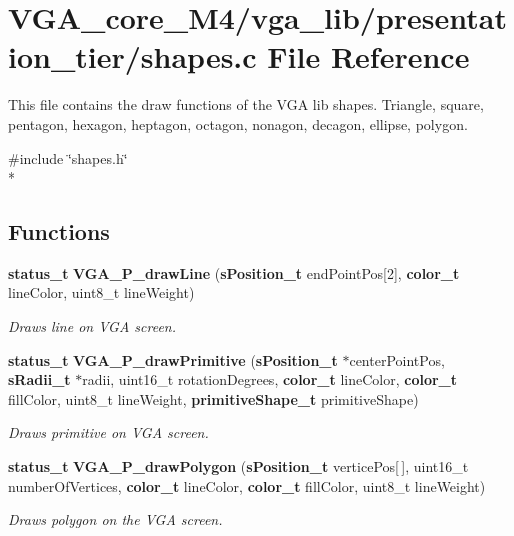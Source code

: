 \section{V\+G\+A\+\_\+core\+\_\+\+M4/vga\+\_\+lib/presentation\+\_\+tier/shapes.c File Reference}
\label{shapes_8c}


This file contains the draw functions of the V\+GA lib shapes. Triangle, square, pentagon, hexagon, heptagon, octagon, nonagon, decagon, ellipse, polygon.  


{\ttfamily \#include \char`\"{}shapes.\+h\char`\"{}}\\*
\subsection*{Functions}
\begin{DoxyCompactItemize}
\item 
{\bf status\+\_\+t} {\bf V\+G\+A\+\_\+\+P\+\_\+draw\+Line} ({\bf s\+Position\+\_\+t} end\+Point\+Pos[2], {\bf color\+\_\+t} line\+Color, uint8\+\_\+t line\+Weight)
\begin{DoxyCompactList}\small\item\em Draws line on V\+GA screen. \end{DoxyCompactList}\item 
{\bf status\+\_\+t} {\bf V\+G\+A\+\_\+\+P\+\_\+draw\+Primitive} ({\bf s\+Position\+\_\+t} $\ast$center\+Point\+Pos, {\bf s\+Radii\+\_\+t} $\ast$radii, uint16\+\_\+t rotation\+Degrees, {\bf color\+\_\+t} line\+Color, {\bf color\+\_\+t} fill\+Color, uint8\+\_\+t line\+Weight, {\bf primitive\+Shape\+\_\+t} primitive\+Shape)
\begin{DoxyCompactList}\small\item\em Draws primitive on V\+GA screen. \end{DoxyCompactList}\item 
{\bf status\+\_\+t} {\bf V\+G\+A\+\_\+\+P\+\_\+draw\+Polygon} ({\bf s\+Position\+\_\+t} vertice\+Pos[$\,$], uint16\+\_\+t number\+Of\+Vertices, {\bf color\+\_\+t} line\+Color, {\bf color\+\_\+t} fill\+Color, uint8\+\_\+t line\+Weight)
\begin{DoxyCompactList}\small\item\em Draws polygon on the V\+GA screen. \end{DoxyCompactList}\end{DoxyCompactItemize}


